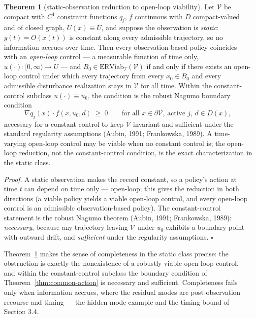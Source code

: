 \documentclass[10pt,twocolumn]{article}
\theoremstyle{definition}
\newtheorem{theorem}{Theorem}
\begin{document}
\begin{theorem}[static-observation reduction to open-loop viability]\label{thm:static-complete}
Let \(\mathcal{V}\) be compact with \(C^{1}\) constraint functions \(q_{j}\), \(f\) continuous with \(D\) compact-valued and of closed graph, \(U(x) \equiv U\), and suppose the observation is \emph{static}: \(y(t) = O(x(t))\) is constant along every admissible trajectory, so no information accrues over time. Then every observation-based policy coincides with an \emph{open-loop} control --- a measurable function of time only, \(u(\cdot):[0,\infty)\to U\) --- and \(B_{0} \in \mathrm{ERViab}_{\mathcal{I}}(\mathcal{V})\) if and only if there exists an open-loop control under which every trajectory from every \(x_{0} \in B_{0}\) and every admissible disturbance realization stays in \(\mathcal{V}\) for all time. Within the constant-control subclass \(u(\cdot) \equiv u_{0}\), the condition is the robust Nagumo boundary condition
\[
\nabla q_{j}(x) \cdot f(x, u_{0}, d) \;\ge\; 0
\qquad \text{for all } x \in \partial\mathcal{V},\ \text{active } j,\ d \in D(x),
\]
necessary for a constant control to keep \(\mathcal{V}\) invariant and sufficient under the standard regularity assumptions (Aubin, 1991; Frankowska, 1989). A time-varying open-loop control may be viable when no constant control is; the open-loop reduction, not the constant-control condition, is the exact characterization in the static class.
\end{theorem}

\emph{Proof.} A static observation makes the record constant, so a policy's action at time \(t\) can depend on time only --- open-loop; this gives the reduction in both directions (a viable policy yields a viable open-loop control, and every open-loop control is an admissible observation-based policy). The constant-control statement is the robust Nagumo theorem (Aubin, 1991; Frankowska, 1989): \emph{necessary}, because any trajectory leaving \(\mathcal{V}\) under \(u_{0}\) exhibits a boundary point with outward drift, and \emph{sufficient} under the regularity assumptions. \hfill\(\square\)

Theorem~\ref{thm:static-complete} makes the sense of completeness in the static class precise: the obstruction is exactly the nonexistence of a robustly viable open-loop control, and within the constant-control subclass the boundary condition of Theorem~\ref{thm:common-action} is necessary and sufficient. Completeness fails only when information accrues, where the residual modes are post-observation recourse and timing --- the hidden-mode example and the timing bound of Section 3.4.
\end{document}
